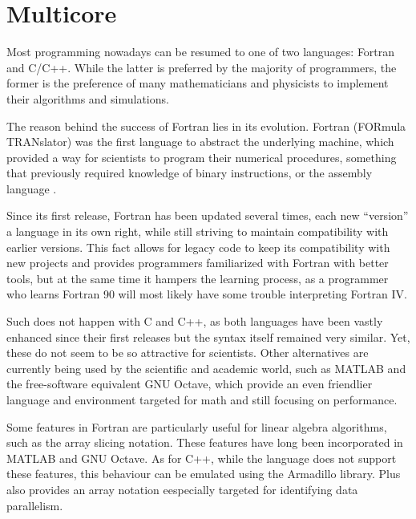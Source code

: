 \documentclass[../thesis]{subfiles}
\begin{document}
	\chapter{Multicore}
	\label{chp:multicore}

	Most \hpc programming nowadays can be resumed to one of two languages: Fortran and C/C++. While the latter is preferred by the majority of programmers, the former is the preference of many mathematicians and physicists to implement their algorithms and simulations.

	The reason behind the success of Fortran lies in its evolution. Fortran (FORmula TRANslator) was the first language to abstract the underlying machine, which provided a way for scientists to program their numerical procedures, something that previously required knowledge of binary instructions, or the assembly language \cite{IBM100:Fortran}.

	Since its first release, Fortran has been updated several times, each new ``version'' a language in its own right, while still striving to maintain compatibility with earlier versions. This fact allows for legacy code to keep its compatibility with new projects and provides programmers familiarized with Fortran with better tools, but at the same time it hampers the learning process, as a programmer who learns Fortran 90 will most likely have some trouble interpreting Fortran IV.

	Such does not happen with C and C++, as both languages have been vastly enhanced since their first releases but the syntax itself remained very similar. Yet, these do not seem to be so attractive for scientists. Other alternatives are currently being used by the scientific and academic world, such as MATLAB and the free-software equivalent GNU Octave, which provide an even friendlier language and environment targeted for math and still focusing on performance.

	Some features in Fortran are particularly useful for linear algebra algorithms, such as the array slicing notation. These features have long been incorporated in MATLAB and GNU Octave. As for C++, while the language does not support these features, this behaviour can be emulated using the Armadillo library. \intel\cilk Plus also provides an array notation eespecially targeted for identifying data parallelism.
\end{document}
